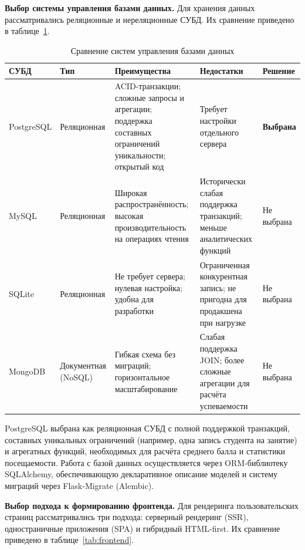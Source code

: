 \textbf{Выбор системы управления базами данных.} Для хранения данных
рассматривались реляционные и нереляционные СУБД. Их сравнение приведено
в таблице~\ref{tab:databases}.

\begin{table}[ht!]
    \centering
    \caption{Сравнение систем управления базами данных}
    \label{tab:databases}
    \small
    \begin{tabularx}{\textwidth}{|p{2.5cm}|p{2.8cm}|X|X|p{2.2cm}|}
        \hline
        \textbf{СУБД} & \textbf{Тип} & \textbf{Преимущества} & \textbf{Недостатки} & \textbf{Решение} \\ \hline
        PostgreSQL &
        Реляционная &
        ACID-транзакции; сложные запросы и агрегации; поддержка составных ограничений
        уникальности; открытый код &
        Требует настройки отдельного сервера &
        \textbf{Выбрана} \\ \hline
        MySQL &
        Реляционная &
        Широкая распространённость; высокая производительность на операциях чтения &
        Исторически слабая поддержка транзакций; меньше аналитических функций &
        Не выбрана \\ \hline
        SQLite &
        Реляционная &
        Не требует сервера; нулевая настройка; удобна для разработки &
        Ограниченная конкурентная запись; не пригодна для продакшена при нагрузке &
        Не выбрана \\ \hline
        MongoDB &
        Документная (NoSQL) &
        Гибкая схема без миграций; горизонтальное масштабирование &
        Слабая поддержка JOIN; более сложные агрегации для расчёта успеваемости &
        Не выбрана \\ \hline
    \end{tabularx}
\end{table}

PostgreSQL выбрана как реляционная СУБД с полной поддержкой транзакций,
составных уникальных ограничений (например, одна запись студента на занятие)
и агрегатных функций, необходимых для расчёта среднего балла и статистики
посещаемости. Работа с базой данных осуществляется через
ORM-библиотеку SQLAlchemy, обеспечивающую декларативное
описание моделей и систему миграций через Flask-Migrate (Alembic).

\textbf{Выбор подхода к формированию фронтенда.} Для рендеринга пользовательских
страниц рассматривались три подхода: серверный рендеринг (SSR), одностраничные
приложения (SPA) и гибридный HTML-first. Их сравнение приведено
в таблице~\ref{tab:frontend}.

